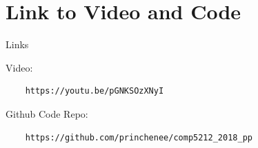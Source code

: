 \documentclass[a4paper]{article}
\begin{document}
\section{Link to Video and Code}
Links

Video:
\begin{verbatim}
    https://youtu.be/pGNKSOzXNyI
\end{verbatim}

Github Code Repo: 
\begin{verbatim}
    https://github.com/princhenee/comp5212_2018_pp
\end{verbatim}



{}

\end{document}
